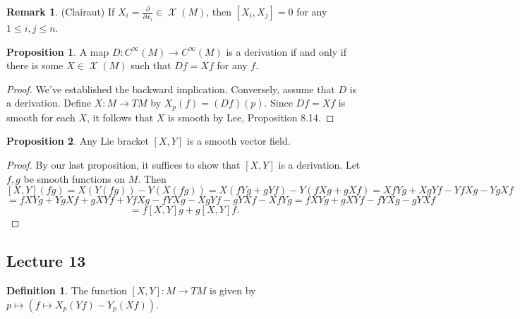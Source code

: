 \documentclass[10pt,letterpaper,cm]{nupset}
\theoremstyle{definition}
\newtheorem*{definition}{Definition}
\newtheorem{remark}{Remark}
\newtheorem{prop}{Proposition}
\newcommand{\1}{\mathbf{1}}
\newcommand{\0}{\vec 0}
\DeclareMathOperator{\vf}{\mathscr{X}}
\begin{document}
\begin{remark} {(Clairaut)}
If $X_i = \frac{\partial}{\partial{x_i}}\in \vf(M)$, then $[X_i, X_j] = 0$ for any $1\leq i,j \leq n$.
\end{remark}

\begin{prop}
A map $D: C^{\infty}(M) \to C^{\infty}(M)$ is a derivation if and only if there is some $X \in \vf(M)$ such that $Df = Xf$ for any $f$.
\end{prop}
\begin{proof}
We've established the backward implication. Conversely, assume that $D$ is a derivation. Define $X : M \to TM$ by $X_p(f) = (Df)(p)$. Since $Df = Xf$ is smooth for each $X$, it follows that $X$ is smooth by Lee, Proposition 8.14.
\end{proof}

\begin{prop}
Any Lie bracket $[X, Y]$ is a smooth vector field.
\end{prop}
\begin{proof}
By our last proposition, it suffices to show that $[X, Y]$ is a derivation. Let $f, g$ be smooth functions on $M$. Then
$$  [X, Y](fg) = X(Y(fg)) - Y(X(fg)) =  X(fYg + gYf) - Y(fXg + gXf) = XfYg + XgYf - YfXg - YgXf$$ $$= fXYg + YgXf + gXYf + YfXg - fYXg - XgYf - gYXf - XfYg = fXYg + gXYf - fYXg - gYXf$$ $$= f[X,Y]g + g[X,Y]f
.$$
\end{proof}

\subsection{Lecture 13}

\begin{definition}
The function $[X, Y] : M \to TM$ is given by $p\mapsto (f \mapsto X_p(Yf) - Y_p(Xf))$.
\end{definition}
\end{document}
